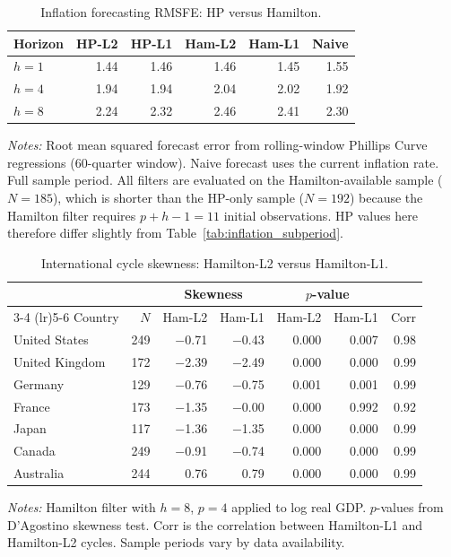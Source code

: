 \documentclass[10pt]{article}
\begin{document}
\begin{table}[htbp]
\centering
\caption{Inflation forecasting RMSFE: HP versus Hamilton.}
\label{tab:hamilton_forecast}
\begin{tabular}{l rrrrr}
\toprule
Horizon & HP-L2 & HP-L1 & Ham-L2 & Ham-L1 & Naive \\
\midrule
$h = 1$ & 1.44 & 1.46 & 1.46 & 1.45 & 1.55 \\
$h = 4$ & 1.94 & 1.94 & 2.04 & 2.02 & 1.92 \\
$h = 8$ & 2.24 & 2.32 & 2.46 & 2.41 & 2.30 \\
\bottomrule
\end{tabular}
\begin{tablenotes}
\small
\item \textit{Notes:} Root mean squared forecast error from rolling-window Phillips Curve regressions (60-quarter window). Naive forecast uses the current inflation rate. Full sample period. All filters are evaluated on the Hamilton-available sample ($N = 185$), which is shorter than the HP-only sample ($N = 192$) because the Hamilton filter requires $p + h - 1 = 11$ initial observations. HP values here therefore differ slightly from Table~\ref{tab:inflation_subperiod}.
\end{tablenotes}
\end{table}

\begin{table}[htbp]
\centering
\caption{International cycle skewness: Hamilton-L2 versus Hamilton-L1.}
\label{tab:hamilton_international}
\begin{tabular}{l r rr rr r}
\toprule
& & \multicolumn{2}{c}{Skewness} & \multicolumn{2}{c}{$p$-value} & \\
\cmidrule(lr){3-4} \cmidrule(lr){5-6}
Country & $N$ & Ham-L2 & Ham-L1 & Ham-L2 & Ham-L1 & Corr \\
\midrule
United States  & 249 & $-$0.71 & $-$0.43 & 0.000 & 0.007 & 0.98 \\
United Kingdom & 172 & $-$2.39 & $-$2.49 & 0.000 & 0.000 & 0.99 \\
Germany        & 129 & $-$0.76 & $-$0.75 & 0.001 & 0.001 & 0.99 \\
France         & 173 & $-$1.35 & $-$0.00 & 0.000 & 0.992 & 0.92 \\
Japan          & 117 & $-$1.36 & $-$1.35 & 0.000 & 0.000 & 0.99 \\
Canada         & 249 & $-$0.91 & $-$0.74 & 0.000 & 0.000 & 0.99 \\
Australia      & 244 &    0.76 &    0.79 & 0.000 & 0.000 & 0.99 \\
\bottomrule
\end{tabular}
\begin{tablenotes}
\small
\item \textit{Notes:} Hamilton filter with $h = 8$, $p = 4$ applied to log real GDP. $p$-values from D'Agostino skewness test. Corr is the correlation between Hamilton-L1 and Hamilton-L2 cycles. Sample periods vary by data availability.
\end{tablenotes}
\end{table}
\end{document}

